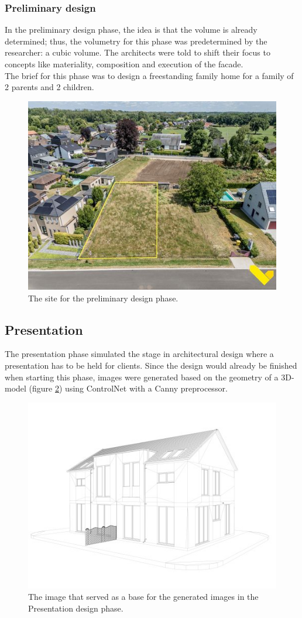 \subsubsection{Preliminary design}
In the preliminary design phase, the idea is that the volume is already determined; thus, the volumetry for this phase was predetermined by the researcher: a cubic volume. The architects were told to shift their focus to concepts like materiality, composition and execution of the facade.\\
The brief for this phase was to design a freestanding family home for a family of 2 parents and 2 children. \\
\begin{figure}
    \centering
    \includegraphics[width=0.75\linewidth]{Images/Methodology/Preliminary_design_brief.png}
    \caption{The site for the preliminary design phase.}
    \label{fig:preliminary-site}
\end{figure}

\subsection{Presentation}
The presentation phase simulated the stage in architectural design where a presentation has to be held for clients. Since the design would already be finished when starting this phase, images were generated based on the geometry of a 3D-model (figure \ref{fig:presentation-image}) using ControlNet with a Canny preprocessor.
\begin{figure}[H]
    \centering
    \includegraphics[width=0.5\linewidth]{Images//Methodology/presentation_image.png}
    \caption{The image that served as a base for the generated images in the Presentation design phase.}
    \label{fig:presentation-image}
\end{figure}

